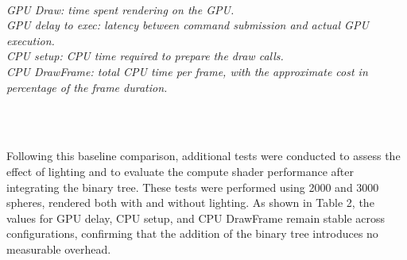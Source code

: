 \documentclass{rapportcs}
\begin{document}
        \begin{table}[h]
            \centering
            \caption{Comparison between fragment shader and compute shader}
        \end{table}
        
        \vspace{-2ex}
        \noindent
        \begin{minipage}{\textwidth}
        \scriptsize
        \textit{\\
            GPU Draw: time spent rendering on the GPU.\\
            GPU delay to exec: latency between command submission and actual GPU execution.\\
            CPU setup: CPU time required to prepare the draw calls.\\
            CPU DrawFrame: total CPU time per frame, with the approximate cost in percentage of the frame duration.
        }
        \end{minipage}\\ \\
    
        \newpage
    
        \noindent Following this baseline comparison, additional tests were conducted to assess the effect of lighting and to evaluate the compute shader performance after integrating the binary tree. These tests were performed using 2000 and 3000 spheres, rendered both with and without lighting. As shown in Table 2, the values for GPU delay, CPU setup, and CPU DrawFrame remain stable across configurations, confirming that the addition of the binary tree introduces no measurable overhead. \\
    
\end{document}
